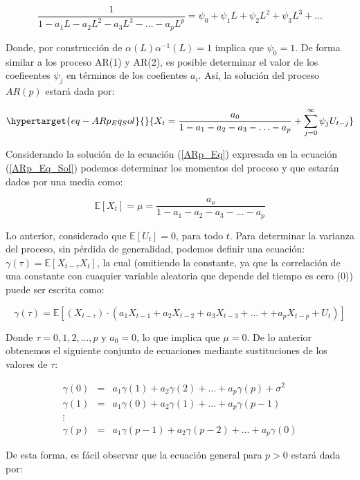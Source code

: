 \documentclass[
  a4paper,
]{article}
\begin{document}
\[
\frac{1}{1 - a_1 L  - a_2 L^2 - a_3 L^3  - \ldots - a_p L^p} = \psi_0 + \psi_1 L + \psi_2 L^2 + \psi_3 L^3 + \ldots
\]

Donde, por construcción de \(\alpha(L) \alpha^{-1}(L) = 1\) implica que
\(\psi_0 = 1\). De forma similar a los proceso AR(1) y AR(2), es posible
determinar el valor de los coefieentes \(\psi_j\) en términos de los
coefientes \(a_i\). Así, la solución del proceso \(AR(p)\) estará dada
por:

\begin{equation}\protect\hypertarget{eq-ARp_Eq_Sol}{}{
X_t = \frac{a_0}{1 - a_1  - a_2 - a_3  - \ldots - a_p} + \sum^{\infty}_{j = 0} \psi_j U_{t-j}
}\label{eq-ARp_Eq_Sol}\end{equation}

Considerando la solución de la ecuación (\ref{ARp_Eq}) expresada en la
ecuación (\ref{ARp_Eq_Sol}) podemos determinar los momentos del proceso
y que estarán dados por una media como:

\[
\mathbb{E}[X_t] = \mu = \frac{a_o}{1 - a_1  - a_2 - a_3  - \ldots - a_p}
\]

Lo anterior, considerado que \(\mathbb{E}[U_t] = 0\), para todo \(t\).
Para determinar la varianza del proceso, sin pérdida de generalidad,
podemos definir una ecuación:
\(\gamma(\tau) = \mathbb{E}[X_{t - \tau} X_t]\), la cual (omitiendo la
constante, ya que la correlación de una constante con cuaquier variable
aleatoria que depende del tiempo es cero (0)) puede ser escrita como:

\[
\gamma(\tau) = \mathbb{E}[(X_{t - \tau}) \cdot (a_1 X_{t-1} + a_2 X_{t-2} + a_3 X_{t-3} + \ldots + + a_p X_{t-p} + U_t)]
\]

Donde \(\tau = 0, 1, 2, \ldots, p\) y \(a_0 = 0\), lo que implica que
\(\mu = 0\). De lo anterior obtenemos el siguiente conjunto de
ecuaciones mediante sustituciones de los valores de \(\tau\):

\begin{eqnarray}
    \gamma(0) & = & a_1 \gamma(1) + a_2 \gamma(2) + \ldots + a_p \gamma(p) + \sigma^2 \nonumber \\
    \gamma(1) & = & a_1 \gamma(0) + a_2 \gamma(1) + \ldots + a_p \gamma(p-1) \nonumber \\
    \vdots \nonumber \\
    \gamma(p) & = & a_1 \gamma(p-1) + a_2 \gamma(p-2) + \ldots + a_p \gamma(0) \nonumber
\end{eqnarray}

De esta forma, es fácil observar que la ecuación general para \(p > 0\)
estará dada por:
\end{document}
